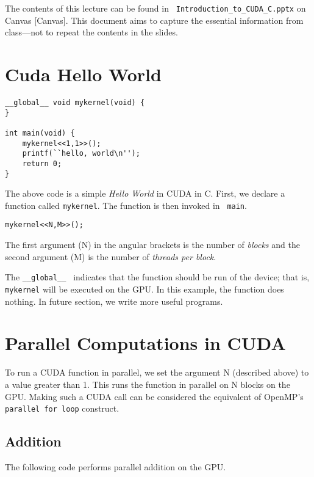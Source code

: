 \documentclass[twoside]{article}
\begin{document}
The contents of this lecture can be found in {\tt
Introduction\_to\_CUDA\_C.pptx} on Canvas [Canvas]. This document aims to capture the
essential information from class---not to repeat the contents in the slides.

\section{Cuda Hello World}

\begin{verbatim}
__global__ void mykernel(void) {
}

int main(void) {
    mykernel<<1,1>>();
    printf(``hello, world\n'');
    return 0;
}
\end{verbatim}

The above code is a simple {\it Hello World} in CUDA in C. First, we declare
a function called {\tt mykernel}. The function is then invoked in {\tt
main}. 

\begin{center}
    {{\tt mykernel<<N,M>>(); }}
\end{center}


The first argument (N) in the angular brackets is the number of {\it
blocks} and the second argument (M) is the number of {\it threads per block}.

The {\tt \_\_global\_\_ } indicates that the function should be run of the
device; that is, {\tt mykernel} will be executed on the GPU. In this example,
the function does nothing. In future section, we write more useful programs.

\section{Parallel Computations in CUDA}

To run a CUDA function in parallel, we set the argument N (described above) to
a value greater than 1. This runs the function in parallel on N blocks on
the GPU. Making such a CUDA call can be considered the
equivalent of OpenMP's {\tt parallel for loop} construct.

\subsection{Addition}

The following code performs parallel addition on the GPU.
\end{document}
